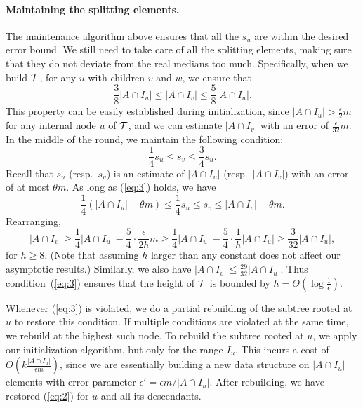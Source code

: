 \documentclass[10pt]{article}
\newcommand{\eps}{\epsilon}
\begin{document}
\paragraph{Maintaining the splitting elements.}
The maintenance algorithm above ensures that all the $s_u$ are within the
desired error bound.  We still need to take care of all the splitting
elements, making sure that they do not deviate from the real medians too
much.  Specifically, when we build $\mathcal{T}$, for any $u$ with children $v$ and
$w$, we ensure that
\begin{equation}
\label{eq:2}
\frac{3}{8}|A \cap I_u| \le |A \cap I_v| \le
\frac{5}{8} |A \cap I_u|.
\end{equation}
This property can be easily established during initialization, since $|A
\cap I_u| > \frac{\eps}{2}m$ for any internal node $u$ of $\mathcal{T}$, and we can
estimate $|A\cap I_v|$ with an error of $\frac{\eps}{32}m$.  In the middle
of the round, we maintain the following condition:
\begin{equation}
\label{eq:3}
\frac{1}{4} s_u \le s_v \le \frac{3}{4} s_u.
\end{equation}
Recall that $s_u$ (resp.\ $s_v$) is an estimate of $|A \cap I_u|$ (resp.\
$|A \cap I_v|$) with an error of at most $\theta m$.  As long as
(\ref{eq:3}) holds, we have
\[
\frac{1}{4} (|A \cap I_u| - \theta m) \le \frac{1}{4} s_u \le s_v \le |A
\cap I_v| + \theta m.
\]
Rearranging,
\[
|A \cap I_v| \ge \frac{1}{4}|A\cap I_u| - \frac{5}{4}\cdot \frac{\eps}{2h}
m \ge \frac{1}{4}|A\cap I_u| - \frac{5}{4}\cdot \frac{1}{h}|A\cap I_u| \ge
\frac{3}{32} |A\cap I_u|,
\]
for $h\ge 8$. (Note that assuming $h$ larger than any constant does not
affect our asymptotic results.)  Similarly, we also have $|A\cap I_v | \le
\frac{29}{32} |A \cap I_u|$.  Thus condition~(\ref{eq:3}) ensures that the
height of $\mathcal{T}$ is bounded by $h = \Theta(\log\frac{1}{\eps})$.

Whenever (\ref{eq:3}) is violated, we do a partial rebuilding of the
subtree rooted at $u$ to restore this condition.  If multiple conditions
are violated at the same time, we rebuild at the highest such node.  To
rebuild the subtree rooted at $u$, we apply our initialization algorithm,
but only for the range $I_u$.  This incurs a cost of $O(k \frac{|A\cap
  I_u|}{\eps m})$, since we are essentially building a new data structure
on $|A \cap I_u|$ elements with error parameter $\eps' = \eps m / |A \cap
I_u|$.  After rebuilding, we have restored (\ref{eq:2}) for $u$ and all its
descendants.
\end{document}
